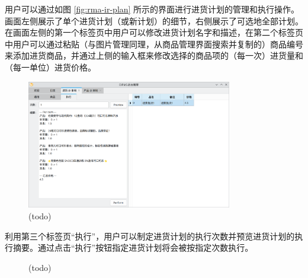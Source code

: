 用户可以通过如图 \ref{fig:rma-ir-plan} 所示的界面进行进货计划的管理和执行操作。画面左侧展示了单个进货计划（或新计划）的细节，右侧展示了可选地全部计划。在画面左侧的第一个标签页中用户可以修改进货计划名字和描述，在第二个标签页中用户可以通过粘贴（与图片管理同理，从商品管理界面搜索并复制的）商品编号来添加进货商品，并通过上侧的输入框来修改选择的商品项的（每一次）进货量和（每一单位）进货价格。

\begin{figure}[htbp]
	\centering
	\includegraphics[width=0.8\textwidth]{./exp/rma-ir-exec-1.png}
	\caption{(todo)}
	\label{fig:rma-ir-exec-1}
\end{figure}

利用第三个标签页“执行”，用户可以制定进货计划的执行次数并预览进货计划的执行摘要。通过点击“执行”按钮指定进货计划将会被按指定次数执行。

\begin{figure}[htbp]
    \hfill
	\caption{(todo)}
	\label{fig:rma-audit}
\end{figure}


